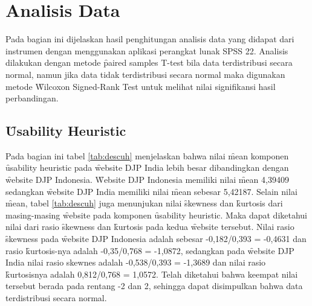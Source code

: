 \section{Analisis Data}
Pada bagian ini dijelaskan hasil penghitungan analisis data yang didapat dari instrumen dengan menggunakan aplikasi perangkat lunak SPSS 22. Analisis dilakukan dengan metode \f{paired samples T-test} bila data terdistribusi secara normal, namun jika data tidak terdistribusi secara normal maka digunakan metode \f{Wilcoxon Signed-Rank Test} untuk melihat nilai signifikansi hasil perbandingan.
\subsection{\f{Usability Heuristic}}
Pada bagian ini tabel \ref{tab:descuh} menjelaskan bahwa nilai \f{mean} komponen \f{usability heuristic} pada \f{website} DJP India lebih besar dibandingkan dengan \f{website} DJP Indonesia. \f{Website} DJP Indonesia memiliki nilai \f{mean} 4,39409 sedangkan \f{website} DJP India memiliki nilai \f{mean} sebesar 5,42187. Selain nilai \f{mean}, tabel \ref{tab:descuh} juga menunjukan nilai \f{skewness} dan \f{kurtosis} dari masing-masing \f{website} pada komponen \f{usability heuristic}. Maka dapat diketahui nilai dari rasio \f{skewness} dan \f{kurtosis} pada kedua \f{website} tersebut. Nilai rasio \f{skewness} pada \f{website} DJP Indonesia adalah sebesar -0,182/0,393 = -0,4631 dan rasio \f{kurtosis}-nya adalah -0,35/0,768 = -1,0872, sedangkan pada \f{website} DJP India nilai rasio skewnes adalah -0,538/0,393 = -1,3689 dan nilai rasio \f{kurtosis}nya adalah 0,812/0,768 = 1,0572. Telah diketahui bahwa keempat nilai tersebut berada pada rentang -2 dan 2, sehingga dapat disimpulkan bahwa data terdistribusi secara normal. 
